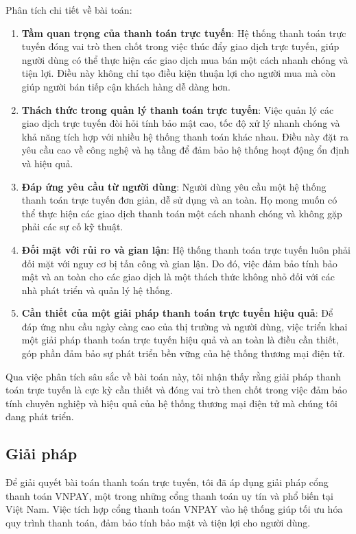 \documentclass[../DoAn.tex]{subfiles}
\begin{document}
Phân tích chi tiết về bài toán:
\begin{enumerate}
    \item \textbf{Tầm quan trọng của thanh toán trực tuyến}: Hệ thống thanh toán trực tuyến đóng vai trò then chốt trong việc thúc đẩy giao dịch trực tuyến, giúp người dùng có thể thực hiện các giao dịch mua bán một cách nhanh chóng và tiện lợi. Điều này không chỉ tạo điều kiện thuận lợi cho người mua mà còn giúp người bán tiếp cận khách hàng dễ dàng hơn.
    \item \textbf{Thách thức trong quản lý thanh toán trực tuyến}: Việc quản lý các giao dịch trực tuyến đòi hỏi tính bảo mật cao, tốc độ xử lý nhanh chóng và khả năng tích hợp với nhiều hệ thống thanh toán khác nhau. Điều này đặt ra yêu cầu cao về công nghệ và hạ tầng để đảm bảo hệ thống hoạt động ổn định và hiệu quả.
    \item \textbf{Đáp ứng yêu cầu từ người dùng}: Người dùng yêu cầu một hệ thống thanh toán trực tuyến đơn giản, dễ sử dụng và an toàn. Họ mong muốn có thể thực hiện các giao dịch thanh toán một cách nhanh chóng và không gặp phải các sự cố kỹ thuật.
    \item \textbf{Đối mặt với rủi ro và gian lận}: Hệ thống thanh toán trực tuyến luôn phải đối mặt với nguy cơ bị tấn công và gian lận. Do đó, việc đảm bảo tính bảo mật và an toàn cho các giao dịch là một thách thức không nhỏ đối với các nhà phát triển và quản lý hệ thống.
    \item \textbf{Cần thiết của một giải pháp thanh toán trực tuyến hiệu quả}: Để đáp ứng nhu cầu ngày càng cao của thị trường và người dùng, việc triển khai một giải pháp thanh toán trực tuyến hiệu quả và an toàn là điều cần thiết, góp phần đảm bảo sự phát triển bền vững của hệ thống thương mại điện tử.
\end{enumerate}
Qua việc phân tích sâu sắc về bài toán này, tôi nhận thấy rằng giải pháp thanh toán trực tuyến là cực kỳ cần thiết và đóng vai trò then chốt trong việc đảm bảo tính chuyên nghiệp và hiệu quả của hệ thống thương mại điện tử mà chúng tôi đang phát triển.

\subsection{Giải pháp}
Để giải quyết bài toán thanh toán trực tuyến, tôi đã áp dụng giải pháp cổng thanh toán VNPAY, một trong những cổng thanh toán uy tín và phổ biến tại Việt Nam. Việc tích hợp cổng thanh toán VNPAY vào hệ thống giúp tối ưu hóa quy trình thanh toán, đảm bảo tính bảo mật và tiện lợi cho người dùng.
\end{document}

